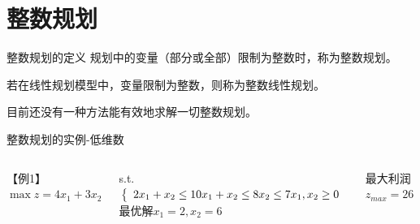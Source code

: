 \documentclass[xcolor=table,dvipsnames,svgnames,aspectratio=169,fontset=ubuntu]{ctexbeamer}
\let\\\relax
\begin{document}
\section{整数规划}

\begin{frame}{整数规划的定义}
  规划中的变量（部分或全部）限制为整数时，称为整数规划。

  \vskip 12pt

  若在线性规划模型中，变量限制为整数，则称为整数线性规划。

  \vskip 12pt

  目前还没有一种方法能有效地求解一切整数规划。
\end{frame}

\begin{frame}{整数规划的实例-低维数}
  \begin{columns}

    【例1】
    \vskip 10pt
    $\max z=4 x_1+3 x_2$

    \vskip 15pt
    s.t. $\left\{\begin{array}{l}2 x_1+x_2 \leq 10 \\ x_1+x_2 \leq 8 \\ x_2 \leq 7 \\ x_1, x_2 \geq 0\end{array}\right.$
    \vskip 15pt
    最优解$x_1=2,x_2=6$
    
    最大利润$z_{max}=26$
    \begin{figure}
      \centering
      \includegraphics[width=1.2\textwidth]{绘图法.png}
    \end{figure}
  \end{columns}
\end{frame}
\end{document}
